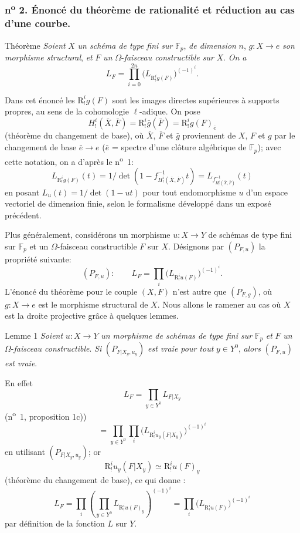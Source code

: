 \subsubsection*{n\textsuperscript{o} 2. Énoncé du théorème de rationalité et réduction au cas d'une courbe.}

\begin{statement}{Théorème}
\emph{Soient} $X$ \emph{un schéma de type fini sur} $\mathbb{F}_p$, \emph{de dimension} $n$, $g:X\to e$ \emph{son morphisme structural}, \emph{et} $F$ \emph{un} $\Omega$-\emph{faisceau constructible sur} $X$. \emph{On a}
\[
L_F=\prod_{i=0}^{2n}\bigl(L_{\mathrm{R}^i_!g(F)}\bigr)^{(-1)^i}.
\tag{1}
\]
\end{statement}

Dans cet énoncé les $\mathrm{R}^i_!g(F)$ sont les images directes supérieures à supports propres, au sens de la cohomologie $\ell$-adique. On pose
\[
H^i_!(\bar X,\bar F)=\mathrm{R}^i_!\bar g(\bar F)=\mathrm{R}^i_!g(F)_{\bar e}
\]
(théorème du changement de base), où 
$\bar X$, $\bar F$ et $\bar g$
proviennent de $X$, $F$ et $g$ par le changement de base $\bar e\to e$ ($\bar e$ = spectre d'une clôture algébrique de $\mathbb{F}_p$); avec cette notation, on a d'après le n\textsuperscript{o}~1:
\[
L_{\mathrm{R}^i_!g(F)}(t)=1/\det(1-f^{-1}_{H^i_!(\bar X,\bar F)}t)
 =L_{f^{-1}_{H^i_!(\bar X,\bar F)}}(t)
\]
en posant $L_u(t)=1/\det(1-ut)$ pour tout endomorphisme $u$ d'un espace vectoriel de dimension finie, selon le formalisme développé dans un exposé précédent.

Plus généralement, considérons un morphisme $u:X\to Y$ de schémas de type fini sur $\mathbb{F}_p$ et un $\Omega$-faisceau constructible $F$ sur $X$. Désignons par $(P_{F,u})$ la propriété suivante:
\[
(P_{F,u}):\qquad
L_F=\prod_i\bigl(L_{\mathrm{R}^i_!u(F)}\bigr)^{(-1)^i}.
\]
L'énoncé du théorème pour le couple $(X,F)$ n'est autre que $(P_{F,g})$, où $g:X\to e$ est le morphisme structural de $X$. Nous allons le ramener au cas où $X$ est la droite projective grâce à quelques lemmes.

\begin{statement}{Lemme 1}
\emph{Soient} $u:X\to Y$ \emph{un morphisme de schémas de type fini sur} $\mathbb{F}_p$ \emph{et} $F$ \emph{un} $\Omega$-\emph{faisceau constructible}. \emph{Si} $(P_{F|X_y,u_y})$ \emph{est vraie pour tout} $y\in Y^0$, \emph{alors} $(P_{F,u})$ \emph{est vraie}.
\end{statement}

En effet
\[
L_F=\prod_{y\in Y^0}L_{F|X_y}
\]
(n\textsuperscript{o}~1, proposition 1c))
\[
=\prod_{y\in Y^0}\prod_i\bigl(L_{\mathrm{R}^i_!u_y(F|X_y)}\bigr)^{(-1)^i}
\]
en utilisant $(P_{F|X_y,u_y})$; or
\[
\mathrm{R}^i_!u_y(F|X_y)\simeq \mathrm{R}^i_!u(F)_y
\]
(théorème du changement de base), ce qui 
donne :
\[
L_F=\prod_i\left(\prod_{y\in Y^0}L_{\mathrm{R}^i_!u(F)_y}\right)^{(-1)^i}
=\prod_i\bigl(L_{\mathrm{R}^i_!u(F)}\bigr)^{(-1)^i}
\]
par
définition de la fonction $L$ sur $Y$.

